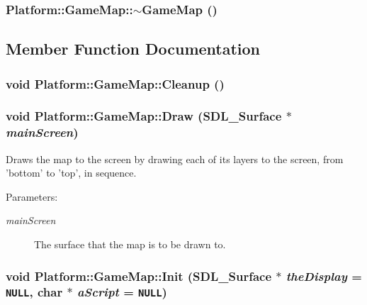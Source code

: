 \hypertarget{class_platform_1_1_game_map_ad7094a561f89baf77d2015768dd9808}{
\subsubsection[{$\sim$GameMap}]{\setlength{\rightskip}{0pt plus 5cm}Platform::GameMap::$\sim$GameMap ()}}
\label{de/db6/class_platform_1_1_game_map_ad7094a561f89baf77d2015768dd9808}




\subsection{Member Function Documentation}
\hypertarget{class_platform_1_1_game_map_3a2969cccbc16f1ad11e505da961a105}{
\subsubsection[{Cleanup}]{\setlength{\rightskip}{0pt plus 5cm}void Platform::GameMap::Cleanup ()}}
\label{de/db6/class_platform_1_1_game_map_3a2969cccbc16f1ad11e505da961a105}


\hypertarget{class_platform_1_1_game_map_08581c79e3244f70c4e26b886b0479de}{
\subsubsection[{Draw}]{\setlength{\rightskip}{0pt plus 5cm}void Platform::GameMap::Draw (SDL\_\-Surface $\ast$ {\em mainScreen})}}
\label{de/db6/class_platform_1_1_game_map_08581c79e3244f70c4e26b886b0479de}


Draws the map to the screen by drawing each of its layers to the screen, from 'bottom' to 'top', in sequence.

\begin{Desc}
\item[Parameters:]
\begin{description}
\item[{\em mainScreen}]The surface that the map is to be drawn to. \end{description}
\end{Desc}
\hypertarget{class_platform_1_1_game_map_0f5c16cce18b155235588af572cfba7f}{
\subsubsection[{Init}]{\setlength{\rightskip}{0pt plus 5cm}void Platform::GameMap::Init (SDL\_\-Surface $\ast$ {\em theDisplay} = {\tt NULL}, \/  char $\ast$ {\em aScript} = {\tt NULL})}}
\label{de/db6/class_platform_1_1_game_map_0f5c16cce18b155235588af572cfba7f}


